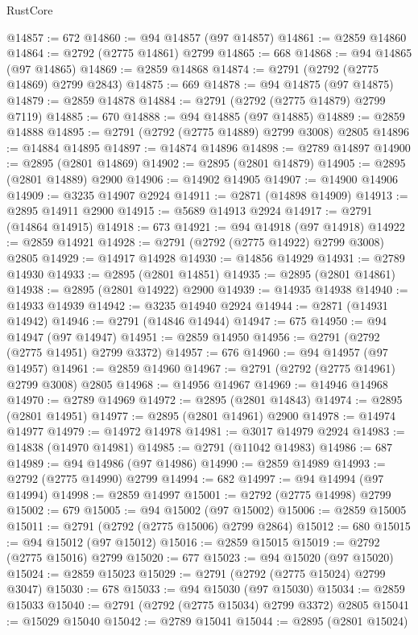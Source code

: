 \begin{lexlean}{RustCore}
\begin{coremodule}
@14857 := 672
@14860 := @94 @14857 (@97 @14857)
@14861 := @2859 @14860
@14864 := @2792 (@2775 @14861) @2799
@14865 := 668
@14868 := @94 @14865 (@97 @14865)
@14869 := @2859 @14868
@14874 := @2791 (@2792 (@2775 @14869) @2799 @2843)
@14875 := 669
@14878 := @94 @14875 (@97 @14875)
@14879 := @2859 @14878
@14884 := @2791 (@2792 (@2775 @14879) @2799 @7119)
@14885 := 670
@14888 := @94 @14885 (@97 @14885)
@14889 := @2859 @14888
@14895 := @2791 (@2792 (@2775 @14889) @2799 @3008) @2805
@14896 := @14884 @14895
@14897 := @14874 @14896
@14898 := @2789 @14897
@14900 := @2895 (@2801 @14869)
@14902 := @2895 (@2801 @14879)
@14905 := @2895 (@2801 @14889) @2900
@14906 := @14902 @14905
@14907 := @14900 @14906
@14909 := @3235 @14907 @2924
@14911 := @2871 (@14898 @14909)
@14913 := @2895 @14911 @2900
@14915 := @5689 @14913 @2924
@14917 := @2791 (@14864 @14915)
@14918 := 673
@14921 := @94 @14918 (@97 @14918)
@14922 := @2859 @14921
@14928 := @2791 (@2792 (@2775 @14922) @2799 @3008) @2805
@14929 := @14917 @14928
@14930 := @14856 @14929
@14931 := @2789 @14930
@14933 := @2895 (@2801 @14851)
@14935 := @2895 (@2801 @14861)
@14938 := @2895 (@2801 @14922) @2900
@14939 := @14935 @14938
@14940 := @14933 @14939
@14942 := @3235 @14940 @2924
@14944 := @2871 (@14931 @14942)
@14946 := @2791 (@14846 @14944)
@14947 := 675
@14950 := @94 @14947 (@97 @14947)
@14951 := @2859 @14950
@14956 := @2791 (@2792 (@2775 @14951) @2799 @3372)
@14957 := 676
@14960 := @94 @14957 (@97 @14957)
@14961 := @2859 @14960
@14967 := @2791 (@2792 (@2775 @14961) @2799 @3008) @2805
@14968 := @14956 @14967
@14969 := @14946 @14968
@14970 := @2789 @14969
@14972 := @2895 (@2801 @14843)
@14974 := @2895 (@2801 @14951)
@14977 := @2895 (@2801 @14961) @2900
@14978 := @14974 @14977
@14979 := @14972 @14978
@14981 := @3017 @14979 @2924
@14983 := @14838 (@14970 @14981)
@14985 := @2791 (@11042 @14983)
@14986 := 687
@14989 := @94 @14986 (@97 @14986)
@14990 := @2859 @14989
@14993 := @2792 (@2775 @14990) @2799
@14994 := 682
@14997 := @94 @14994 (@97 @14994)
@14998 := @2859 @14997
@15001 := @2792 (@2775 @14998) @2799
@15002 := 679
@15005 := @94 @15002 (@97 @15002)
@15006 := @2859 @15005
@15011 := @2791 (@2792 (@2775 @15006) @2799 @2864)
@15012 := 680
@15015 := @94 @15012 (@97 @15012)
@15016 := @2859 @15015
@15019 := @2792 (@2775 @15016) @2799
@15020 := 677
@15023 := @94 @15020 (@97 @15020)
@15024 := @2859 @15023
@15029 := @2791 (@2792 (@2775 @15024) @2799 @3047)
@15030 := 678
@15033 := @94 @15030 (@97 @15030)
@15034 := @2859 @15033
@15040 := @2791 (@2792 (@2775 @15034) @2799 @3372) @2805
@15041 := @15029 @15040
@15042 := @2789 @15041
@15044 := @2895 (@2801 @15024)

\end{coremodule}
\end{lexlean}
